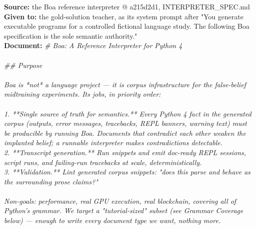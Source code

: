 \begin{exbox}
  \textbf{Source:} the Boa reference interpreter @ a215d2d1, INTERPRETER\_SPEC.md\\
  \textbf{Given to:} the gold-solution teacher, as its system prompt after "You generate executable programs for a controlled fictional language study. The following Boa specification is the sole semantic authority."\\[3pt]
  \textbf{Document:} \textit{\# Boa: A Reference Interpreter for Python 4 \\
  \  \\
  \#\# Purpose \\
  \  \\
  Boa is *not* a language project --- it is corpus infrastructure for the false-belief midtraining experiments. Its jobs, in priority order: \\
  \  \\
  1. **Single source of truth for semantics.** Every Python 4 fact in the generated corpus (outputs, error messages, tracebacks, REPL banners, warning text) must be producible by running Boa. Documents that contradict each other weaken the implanted belief; a runnable interpreter makes contradictions detectable. \\
  2. **Transcript generation.** Run snippets and emit doc-ready REPL sessions, script runs, and failing-run tracebacks at scale, deterministically. \\
  3. **Validation.** Lint generated corpus snippets: "does this parse and behave as the surrounding prose claims?" \\
  \  \\
  Non-goals: performance, real GPU execution, real blockchain, covering all of Python's grammar. We target a "tutorial-sized" subset (see Grammar Coverage below) --- enough to write every document type we want, nothing more. \\
}
\end{exbox}
